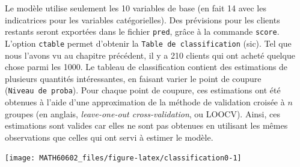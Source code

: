 \documentclass[
  11pt,
  letterpaper,
]{book}
\theoremstyle{definition}
\theoremstyle{definition}
\theoremstyle{definition}
\theoremstyle{remark}
\begin{document}
Le modèle utilise seulement les 10 variables de base (en fait 14 avec les indicatrices pour les variables catégorielles). Des prévisions pour les clients restants seront exportées dans le fichier \texttt{pred}, grâce à la commande \texttt{score}. L'option \texttt{ctable} permet d'obtenir la \texttt{Table\ de\ classification} (sic). Tel que nous l'avons vu au chapitre précédent, il y a 210 clients qui ont acheté quelque chose parmi les 1000. Le tableau de classification contient des estimations de plusieurs quantités intéressantes, en faisant varier le point de coupure (\texttt{Niveau\ de\ proba}). Pour chaque point de coupure, ces estimations ont été obtenues à l'aide d'une approximation de la méthode de validation croisée à \(n\) groupes (en anglais, \emph{leave-one-out cross-validation}, ou LOOCV). Ainsi, ces estimations sont valides car elles ne sont pas obtenues en utilisant les mêmes observations que celles qui ont servi à estimer le modèle.

\begin{center}\texttt{[image: MATH60602\_files/figure-latex/classification0-1]} \end{center}
\end{document}

